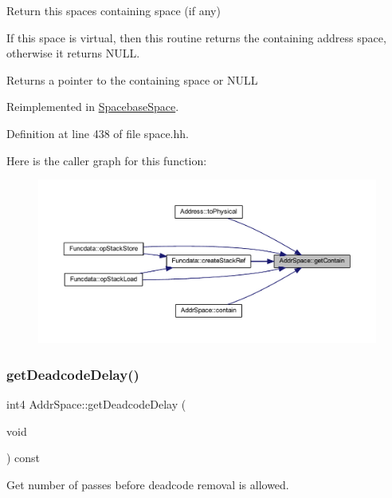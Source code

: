 Return this space\textquotesingle{}s containing space (if any) 

If this space is virtual, then this routine returns the containing address space, otherwise it returns N\+U\+LL. \begin{DoxyReturn}{Returns}
a pointer to the containing space or N\+U\+LL 
\end{DoxyReturn}


Reimplemented in \mbox{\hyperlink{class_spacebase_space_a4d673d57ee17e7b0d99b7152bf1c57ec}{Spacebase\+Space}}.



Definition at line 438 of file space.\+hh.

Here is the caller graph for this function\+:
\nopagebreak
\begin{figure}[H]
\begin{center}
\leavevmode
\includegraphics[width=350pt]{class_addr_space_a616f457a28ab5779167183f47a5707b8_icgraph}
\end{center}
\end{figure}
\mbox{\label{class_addr_space_a51295f26c99891cb310af0eb0c20d4db}} 
\subsubsection{\texorpdfstring{getDeadcodeDelay()}{getDeadcodeDelay()}}
{\footnotesize\ttfamily int4 Addr\+Space\+::get\+Deadcode\+Delay (\begin{DoxyParamCaption}\item[{void}]{ }\end{DoxyParamCaption}) const\hspace{0.3cm}{\ttfamily [inline]}}



Get number of passes before deadcode removal is allowed. 

